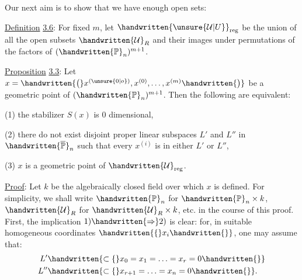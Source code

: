 
Our next aim is to show that we have enough open sets:

\uline{Definition} \uline{3.6}: For fixed $m$, let $\handwritten{\unsure{\mathcal U|U}}_{\mathrm{reg}}$ be the union of all the open subsets $\handwritten{\mathcal U}_R$ and their images under permutations of the factors of $(\handwritten{\mathbb P}_n)^{m+1}$.

\uline{Proposition} \uline{3.3}: Let $x=\handwritten{\bigl(}x^{(\unsure{0|o})},x^{(0)},\ldots,x^{(m)}\handwritten{\bigr)}$ be a geometric point of $(\handwritten{\mathbb P}_n)^{m+1}$. Then the following are equivalent:

(1) the stabilizer $S(x)$ is 0 dimensional,

(2) there do not exist disjoint proper linear subspaces $L'$ and $L''$ in $\handwritten{\overline{\mathbb P}}_n$ such that every $x^{(i)}$ is in either $L'$ or $L''$,

(3) $x$ is a geometric point of $\handwritten{\mathcal U}_{\mathrm{reg}}$.

\uline{Proof}: Let $k$ be the algebraically closed field over which $x$ is defined. For simplicity, we shall write $\handwritten{\mathbb P}_n$ for $\handwritten{\mathbb P}_n\times k$, $\handwritten{\mathcal U}_R$ for $\handwritten{\mathcal U}_R\times k$, etc. in the course of this proof. First, the implication $1)\handwritten{\Rightarrow}2)$ is clear: for, in suitable homogeneous coordinates $\handwritten{\{}x_i\handwritten{\}}$, one may assume that:
\[
\begin{aligned}
L' &\handwritten{\subset\{}x_0=x_1=\ldots=x_r=0\handwritten{\}}\\
L'' &\handwritten{\subset\{}x_{r+1}=\ldots=x_n=0\handwritten{\}}.
\end{aligned}
\]

